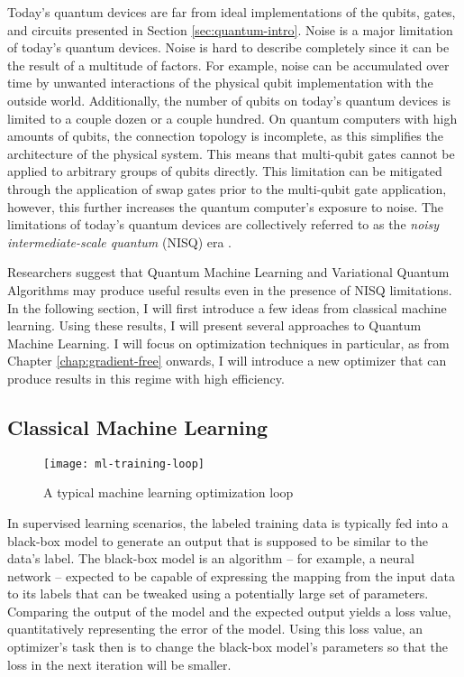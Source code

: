Today's quantum devices are far from ideal implementations of the qubits, gates,
and circuits presented in Section \ref{sec:quantum-intro}.
Noise is a major limitation of today's quantum devices.
Noise is hard to describe completely since it can be the result of a multitude
of factors.
For example, noise can be accumulated over time by unwanted interactions of the
physical qubit implementation with the outside world.
Additionally, the number of qubits on today's quantum devices is limited to a
couple dozen or a couple hundred.
On quantum computers with high amounts of qubits, the connection topology is
incomplete, as this simplifies the architecture of the physical system. 
This means that multi-qubit gates cannot be applied to arbitrary groups of
qubits directly.
This limitation can be mitigated through the application of swap gates prior
to the multi-qubit gate application, however, this further increases the quantum
computer's exposure to noise.
The limitations of today's quantum devices are collectively referred to as the
\emph{noisy intermediate-scale quantum} (NISQ) era
\cite{preskill_quantum_2018,nielsen_quantum_2007}.

Researchers suggest that Quantum Machine Learning and Variational Quantum
Algorithms may produce useful results even in the presence of NISQ limitations.
In the following section, I will first introduce a few ideas from classical
machine learning.
Using these results, I will present several approaches to Quantum Machine
Learning.
I will focus on optimization techniques in particular, as from Chapter
\ref{chap:gradient-free} onwards, I will introduce a new optimizer that can
produce results in this regime with high efficiency.

\subsection{Classical Machine Learning}
\begin{figure}
    \label{fig:ml-training-loop}
    \centering
    \texttt{[image: ml-training-loop]}
    \caption{A typical machine learning optimization loop}
\end{figure}

In supervised learning scenarios, the labeled training data is typically fed
into a black-box model to generate an output that is supposed to be similar to
the data's label.
The black-box model is an algorithm -- for example, a neural network -- expected
to be capable of expressing the mapping from the input data to its labels that
can be tweaked using a potentially large set of parameters.
Comparing the output of the model and the expected output yields a loss value,
quantitatively representing the error of the model.
Using this loss value, an optimizer's task then is to change the black-box
model's parameters so that the loss in the next iteration will be smaller.

